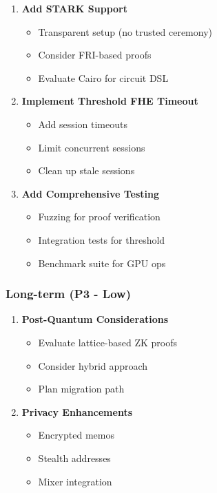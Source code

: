\documentclass[
]{article}
\providecommand{\tightlist}{%
  \setlength{\itemsep}{0pt}\setlength{\parskip}{0pt}}
\begin{document}
\begin{enumerate}
\def\labelenumi{\arabic{enumi}.}
\setcounter{enumi}{6}
\item
  \textbf{Add STARK Support}

  \begin{itemize}
  \tightlist
  \item
    Transparent setup (no trusted ceremony)
  \item
    Consider FRI-based proofs
  \item
    Evaluate Cairo for circuit DSL
  \end{itemize}
\item
  \textbf{Implement Threshold FHE Timeout}

  \begin{itemize}
  \tightlist
  \item
    Add session timeouts
  \item
    Limit concurrent sessions
  \item
    Clean up stale sessions
  \end{itemize}
\item
  \textbf{Add Comprehensive Testing}

  \begin{itemize}
  \tightlist
  \item
    Fuzzing for proof verification
  \item
    Integration tests for threshold
  \item
    Benchmark suite for GPU ops
  \end{itemize}
\end{enumerate}

\subsubsection{Long-term (P3 - Low)}\label{long-term-p3---low}

\begin{enumerate}
\def\labelenumi{\arabic{enumi}.}
\setcounter{enumi}{9}
\item
  \textbf{Post-Quantum Considerations}

  \begin{itemize}
  \tightlist
  \item
    Evaluate lattice-based ZK proofs
  \item
    Consider hybrid approach
  \item
    Plan migration path
  \end{itemize}
\item
  \textbf{Privacy Enhancements}

  \begin{itemize}
  \tightlist
  \item
    Encrypted memos
  \item
    Stealth addresses
  \item
    Mixer integration
  \end{itemize}
\end{enumerate}
\end{document}
